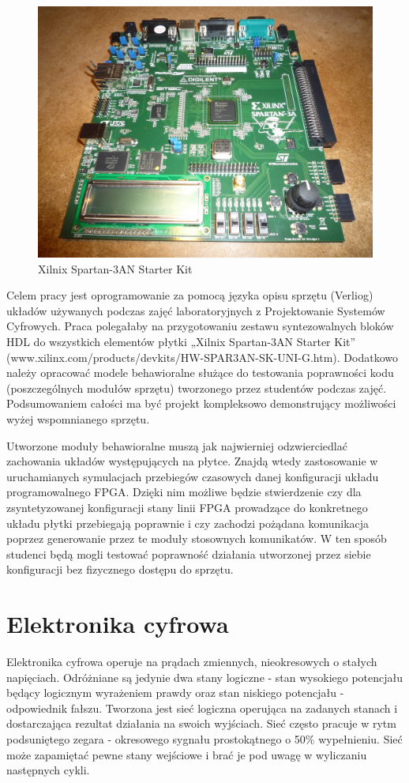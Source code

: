 \documentclass[a4paper,12pt]{article}
\begin{document}
\begin{figure}[htb]
   \centering
   \includegraphics{grafika/spartan3an.jpg}
   \caption{Xilnix Spartan-3AN Starter Kit}
\end{figure}

Celem pracy jest oprogramowanie za pomocą języka opisu sprzętu (Verliog) układów używanych podczas zajęć laboratoryjnych z Projektowanie Systemów Cyfrowych. Praca polegałaby na przygotowaniu zestawu syntezowalnych bloków HDL do wszystkich elementów płytki „Xilnix Spartan-3AN Starter Kit” (www.xilinx.com/products/devkits/HW-SPAR3AN-SK-UNI-G.htm). Dodatkowo należy opracować modele behawioralne służące do testowania poprawności kodu (poszczególnych modułów sprzętu) tworzonego przez studentów podczas zajęć. Podsumowaniem całości ma być projekt kompleksowo demonstrujący możliwości wyżej wspomnianego sprzętu.

Utworzone moduły behawioralne muszą jak najwierniej odzwierciedlać zachowania układów występujących na płytce.
Znajdą wtedy zastosowanie w uruchamianych symulacjach przebiegów czasowych danej konfiguracji układu programowalnego FPGA. Dzięki nim możliwe będzie stwierdzenie czy dla zsyntetyzowanej konfiguracji stany linii FPGA prowadzące do konkretnego układu płytki przebiegają poprawnie i czy zachodzi pożądana komunikacja poprzez generowanie przez te moduły stosownych komunikatów. W ten sposób studenci będą mogli testować poprawność działania utworzonej przez siebie konfiguracji bez fizycznego dostępu do sprzętu.

\newpage

\section{Elektronika cyfrowa}
Elektronika cyfrowa operuje na prądach zmiennych, nieokresowych o stałych napięciach. Odróżniane są jedynie dwa stany logiczne - stan wysokiego potencjału będący logicznym wyrażeniem prawdy oraz stan niskiego potencjału - odpowiednik fałszu. Tworzona jest sieć logiczna operująca na zadanych stanach i dostarczająca rezultat działania na swoich wyjściach. Sieć często pracuje w rytm podsuniętego zegara - okresowego sygnału prostokątnego o 50\% wypełnieniu. Sieć może zapamiętać pewne stany wejściowe i brać je pod uwagę w wyliczaniu następnych cykli.
\end{document}
